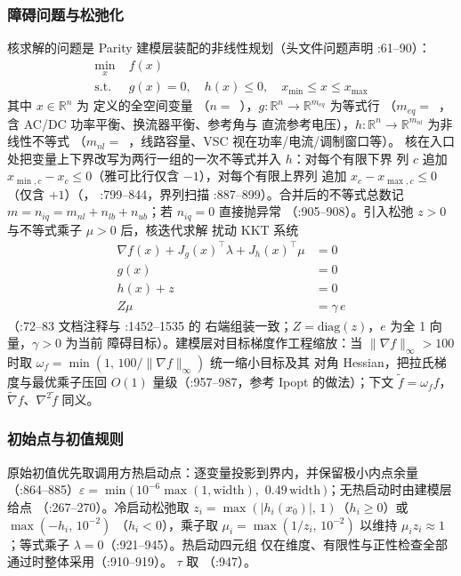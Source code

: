 \subsubsection*{障碍问题与松弛化}
核求解的问题是 Parity 建模层装配的非线性规划（头文件问题声明
:61--90）：
\begin{align*}
\min_{x}\; & f(x)\\
\text{s.t.}\; & g(x) = 0,\quad h(x) \le 0,\quad x_{\min} \le x \le x_{\max}
\end{align*}
其中 $x\in\mathbb{R}^{n}$ 为  定义的全空间变量
（$n=$~），$g:\mathbb{R}^n\to\mathbb{R}^{m_{eq}}$ 为等式行
（$m_{eq}=$~，含 AC/DC 功率平衡、换流器平衡、参考角与
直流参考电压），$h:\mathbb{R}^n\to\mathbb{R}^{m_{nl}}$ 为非线性不等式
（$m_{nl}=$~，线路容量、VSC 视在功率/电流/调制窗口等）。
核在入口处把变量上下界改写为两行一组的一次不等式并入 $h$：对每个有限下界
列 $c$ 追加 $x_{\min,c}-x_c\le 0$（雅可比行仅含 $-1$），对每个有限上界列
追加 $x_c-x_{\max,c}\le 0$（仅含 $+1$）（，
:799--844，界列扫描 :887--899）。合并后的不等式总数记
$m=n_{iq}=m_{nl}+n_{lb}+n_{ub}$；若 $n_{iq}=0$ 直接抛异常
（:905--908）。引入松弛 $z>0$ 与不等式乘子 $\mu>0$ 后，核迭代求解
扰动 KKT 系统
\begin{align*}
\nabla f(x) + J_g(x)^{\top}\lambda + J_h(x)^{\top}\mu &= 0\\
g(x) &= 0\\
h(x) + z &= 0\\
Z\mu &= \gamma\, e
\end{align*}
（:72--83 文档注释与 :1452--1535 的
右端组装一致；$Z=\mathrm{diag}(z)$，$e$ 为全 1 向量，$\gamma>0$ 为当前
障碍目标）。建模层对目标梯度作工程缩放：当
$\lVert\nabla f\rVert_\infty>100$ 时取
$\omega_f=\min(1,\,100/\lVert\nabla f\rVert_\infty)$ 统一缩小目标及其
对角 Hessian，把拉氏梯度与最优乘子压回 $O(1)$ 量级（:957--987，参考
Ipopt  的做法）；下文 $\tilde f=\omega_f f$，
$\tilde\nabla f$、$\nabla^2\tilde f$ 同义。

\subsubsection*{初始点与初值规则}
原始初值优先取调用方热启动点：逐变量投影到界内，并保留极小内点余量
（:864--885）$\varepsilon=\min(\,10^{-6}\max(1,\mathrm{width}),$
$0.49\,\mathrm{width}\,)$；无热启动时由建模层 
给点
（:267--270）。冷启动松弛取
$z_i=\max(|h_i(x_0)|,\,1)$（$h_i\ge0$）或 $\max(-h_i,\,10^{-2})$
（$h_i<0$），乘子取 $\mu_i=\max(1/z_i,\,10^{-2})$ 以维持
$\mu_i z_i\approx1$；等式乘子 $\lambda=0$（:921--945）。热启动四元组
仅在维度、有限性与正性检查全部通过时整体采用（:910--919）。
$\tau$ 取 （:947）。

